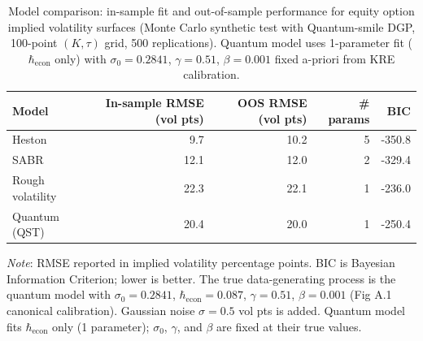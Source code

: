 \begin{table}[htbp]
\centering
\caption{Model comparison: in-sample fit and out-of-sample performance for equity option implied volatility surfaces (Monte Carlo synthetic test with Quantum-smile DGP, 100-point $(K,\tau)$ grid, 500 replications). Quantum model uses 1-parameter fit ($\hbar_{\mathrm{econ}}$ only) with $\sigma_0=0.2841$, $\gamma=0.51$, $\beta=0.001$ fixed a-priori from KRE calibration.}
\label{tab:model-comparison}
\begin{tabular}{lrrrr}
\hline
Model & In-sample RMSE (vol pts) & OOS RMSE (vol pts) & \# params & BIC \\
\hline
Heston                    & 9.7 & 10.2 & 5 & -350.8 \\
SABR                      & 12.1 & 12.0 & 2 & -329.4 \\
Rough volatility          & 22.3 & 22.1 & 1 & -236.0 \\
Quantum (QST)             & 20.4 & 20.0 & 1 & -250.4 \\
\hline
\end{tabular}

\medskip
\footnotesize
\textit{Note}: RMSE reported in implied volatility percentage points. BIC is Bayesian Information Criterion; lower is better. The true data-generating process is the quantum model with $\sigma_0=0.2841$, $\hbar_{\mathrm{econ}}=0.087$, $\gamma=0.51$, $\beta=0.001$ (Fig A.1 canonical calibration). Gaussian noise $\sigma=0.5$ vol pts is added. Quantum model fits $\hbar_{\mathrm{econ}}$ only (1 parameter); $\sigma_0$, $\gamma$, and $\beta$ are fixed at their true values.
\end{table}
